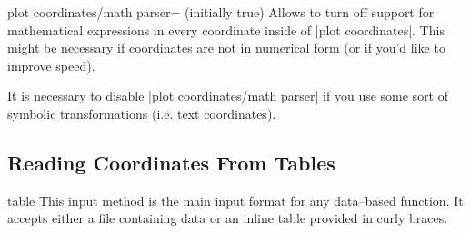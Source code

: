 {\begin{pgfplotskey}{plot coordinates/math parser= (initially true)}
	Allows to turn off support for mathematical expressions in every coordinate inside of |plot coordinates|. This might be necessary if coordinates are not in numerical form (or if you'd like to improve speed).

	It is necessary to disable |plot coordinates/math parser| if you use some sort of symbolic transformations (i.e. text coordinates).
\end{pgfplotskey}


\subsection{Reading Coordinates From Tables}

\begin{addplotoperation}[]{table}{}
\label{pgfplots:addplot:table}
This input method is the main input format for any data--based function. It accepts either a file containing data or an inline table provided in curly braces.


\end{addplotoperation}}
